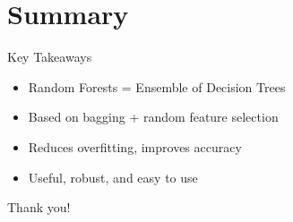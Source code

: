 \documentclass{beamer}
\begin{document}
\section{Summary}

\begin{frame}{Key Takeaways}
\begin{itemize}
    \item Random Forests = Ensemble of Decision Trees
    \item Based on bagging + random feature selection
    \item Reduces overfitting, improves accuracy
    \item Useful, robust, and easy to use
\end{itemize}
\end{frame}

\begin{frame}[standout]
    Thank you!
\end{frame}
\end{document}
